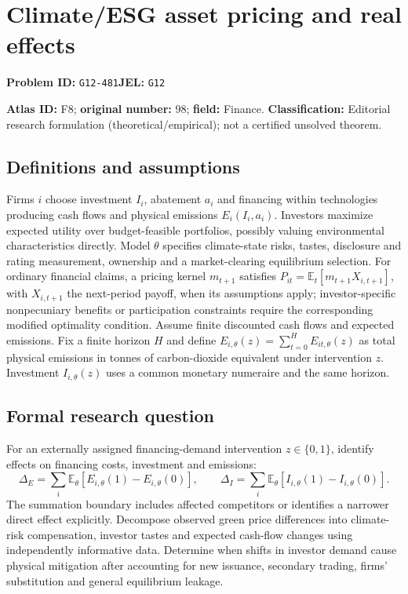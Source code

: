 \documentclass[11pt,a4paper]{article}
\begin{document}
\section*{Climate/ESG asset pricing and real effects}
\textbf{Problem ID:} \texttt{G12-481}\quad \textbf{JEL:} \texttt{G12}\par
\label{problem:OP-0098}
\label{atlas:prob:F8}

\noindent\textbf{Atlas ID:} F8; \textbf{original number:} 98; \textbf{field:} Finance. \textbf{Classification:} Editorial research formulation (theoretical/empirical); not a certified unsolved theorem.

\subsection*{Definitions and assumptions}
Firms $i$ choose investment $I_i$, abatement $a_i$ and financing within technologies producing cash flows and physical emissions $E_i(I_i,a_i)$. Investors maximize expected utility over budget-feasible portfolios, possibly valuing environmental characteristics directly. Model $\theta$ specifies climate-state risks, tastes, disclosure and rating measurement, ownership and a market-clearing equilibrium selection. For ordinary financial claims, a pricing kernel $m_{t+1}$ satisfies $P_{it}=\mathbb E_t[m_{t+1}X_{i,t+1}]$, with $X_{i,t+1}$ the next-period payoff, when its assumptions apply; investor-specific nonpecuniary benefits or participation constraints require the corresponding modified optimality condition. Assume finite discounted cash flows and expected emissions. Fix a finite horizon $H$ and define $E_{i,\theta}(z)=\sum_{t=0}^{H}E_{it,\theta}(z)$ as total physical emissions in tonnes of carbon-dioxide equivalent under intervention $z$. Investment $I_{i,\theta}(z)$ uses a common monetary numeraire and the same horizon.

\subsection*{Formal research question}
For an externally assigned financing-demand intervention $z\in\{0,1\}$, identify effects on financing costs, investment and emissions:
\[
 \Delta_E=\sum_i\mathbb E_\theta[E_{i,\theta}(1)-E_{i,\theta}(0)],
 \qquad
 \Delta_I=\sum_i\mathbb E_\theta[I_{i,\theta}(1)-I_{i,\theta}(0)].
\]
The summation boundary includes affected competitors or identifies a narrower direct effect explicitly. Decompose observed green price differences into climate-risk compensation, investor tastes and expected cash-flow changes using independently informative data. Determine when shifts in investor demand cause physical mitigation after accounting for new issuance, secondary trading, firms’ substitution and general equilibrium leakage.
\end{document}
